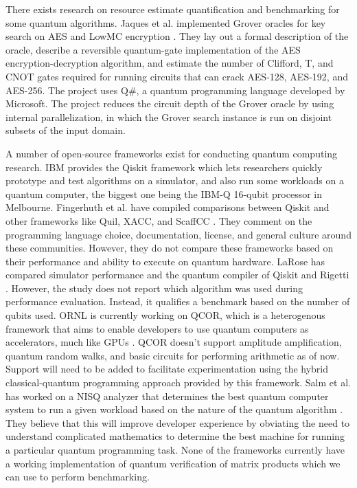 \documentclass[11pt]{article}
\theoremstyle{definition}
\theoremstyle{remark}
\begin{document}
There exists research on resource estimate quantification and benchmarking for
some quantum algorithms. Jaques et al. implemented Grover oracles for key
search on AES and LowMC encryption \cite{canteaut_implementing_2020}. They lay
out a formal description of the oracle,  describe a reversible quantum-gate
implementation of the AES encryption-decryption algorithm, and estimate the
number of Clifford, T, and CNOT gates required for running circuits that can
crack AES-128, AES-192, and AES-256. The project uses Q\#, a quantum
programming language developed by Microsoft. The project reduces the circuit
depth of the Grover oracle by using internal parallelization, in which the
Grover search instance is run on disjoint subsets of the input domain.

A number of open-source frameworks exist for conducting quantum computing
research. IBM provides the Qiskit framework which lets researchers quickly
prototype and test algorithms on a simulator, and also run some workloads on a
quantum computer, the biggest one being the IBM-Q 16-qubit processor in
Melbourne. Fingerhuth et al. have compiled comparisons between Qiskit and other
frameworks like Quil, XACC, and ScaffCC \cite{fingerhuth_open_2018}. They
comment on the programming language choice, documentation, license, and general
culture around these communities. However, they do not compare these frameworks
based on their performance and ability to execute on quantum hardware. LaRose
has compared simulator performance and the quantum compiler of Qiskit and
Rigetti \cite{larose_overview_2019}.  However, the study does not report which
algorithm was used during performance evaluation. Instead, it qualifies a
benchmark based on the number of qubits used. ORNL is currently working on
QCOR, which is a heterogenous framework that aims to enable developers to use
quantum computers as accelerators, much like GPUs \cite{mintz_qcor_2020}. QCOR
doesn’t support amplitude amplification, quantum random walks, and basic
circuits for performing arithmetic as of now. Support will need to be added to
facilitate experimentation using the hybrid classical-quantum programming
approach provided by this framework. Salm et al. has worked on a NISQ analyzer
that determines the best quantum computer system to run a given workload based
on the nature of the quantum algorithm \cite{dustdar_nisq_2020}. They believe
that this will improve developer experience by obviating the need to understand
complicated mathematics to determine the best machine for running a particular
quantum programming task. None of the frameworks currently have a working
implementation of quantum verification of matrix products which we can use to
perform benchmarking.
\end{document}
